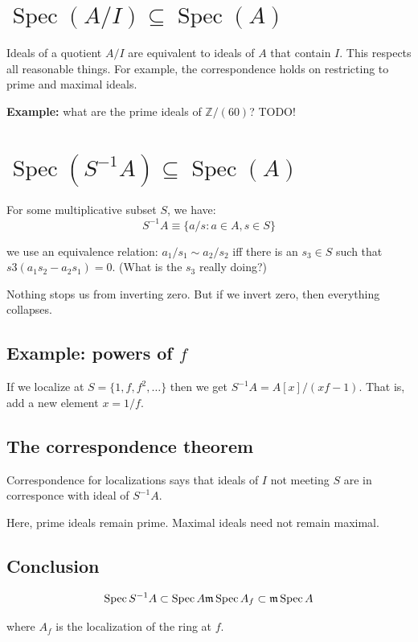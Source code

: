 \documentclass{book}
\newcommand{\Z}{\ensuremath{\mathbb{Z}}}
\newcommand{\spec}{\operatorname{Spec}}
\newcommand{\m}{\mathfrak{m}}
\newcommand{\mspec}{\m\operatorname{Spec}}
\theoremstyle{definition}
\begin{document}
\section{$\spec(A/I) \subseteq \spec(A)$}

Ideals of a quotient $A/I$ are equivalent to ideals of $A$ that contain $I$.
This respects all reasonable things. For example, the correspondence holds
on restricting to prime and maximal ideals.


\textbf{Example:} what are the prime ideals of $\Z/(60)$?  TODO!

\section{$\spec(S^{-1}A) \subseteq \spec(A)$}

For some multiplicative subset $S$, we have:
$$ S^{-1} A \equiv \{ a/s : a \in A, s \in S \} $$

we use an equivalence relation: $a_1/s_1 \sim a_2/s_2$ iff there
is an $s_3 \in S$ such that $s3(a_1 s_2 - a_2 s_1) = 0$.
(What is the $s_3$ really doing?)

Nothing stops us from inverting zero. But if we invert zero, then everything
collapses.

\subsection{Example: powers of $f$}

If we localize at $S = \{ 1, f, f^2, \dots \}$ then we get $S^{-1}A = A[x]/(xf - 1)$.
That is, add a new element $x = 1/f$.

\subsection{The correspondence theorem}
Correspondence
for localizations says that
ideals of $I$ not meeting $S$ are in corresponce with ideal of $S^{-1}A$.

Here, prime ideals remain prime. Maximal ideals need not remain maximal.

\subsection{Conclusion}

$$
\spec S^{-1} A \subset \spec A \\
\mspec A_f \subset \mspec A \\
$$

where $A_f$ is the localization of the ring at $f$.
\end{document}
